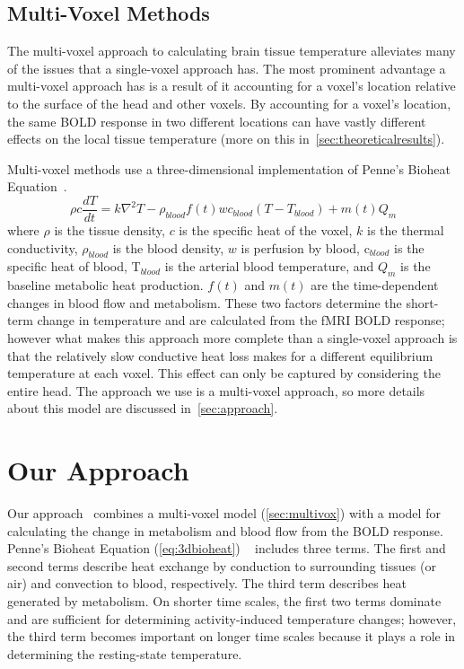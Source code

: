     \subsection{\label{sec:multivox} Multi-Voxel Methods}
    The multi-voxel approach to calculating brain tissue temperature alleviates many of the issues that a single-voxel approach has.  The most prominent advantage a multi-voxel approach has is a result of it accounting for a voxel's location relative to the surface of the head and other voxels.  By accounting for a voxel's location, the same BOLD response in two different locations can have vastly different effects on the local tissue temperature (more on this in~\cref{sec:theoreticalresults}).
    
    Multi-voxel methods use a three-dimensional implementation of Penne's Bioheat Equation~\citep{collins}.
    \begin{equation} \label{eq:3dbioheat} 
    	\rho c \frac{dT}{dt} = k \nabla^{2}T-\rho_{blood}f(t)wc_{blood}(T-T_{blood})+m(t)Q_{m} 
    \end{equation}
  where $\rho$ is the tissue density, $c$ is the specific heat of the voxel, $k$ is the thermal conductivity, $\rho_{blood}$ is the blood density, $w$ is perfusion by blood, c$_{blood}$ is the specific heat of blood, T$_{blood}$ is the arterial blood temperature, and $Q_{m}$ is the baseline metabolic heat production. $f(t)$ and $m(t)$ are the time-dependent changes in blood flow and metabolism. These two factors determine the short-term change in temperature and are calculated from the fMRI BOLD response; however what makes this approach more complete than a single-voxel approach is that the relatively slow conductive heat loss makes for a different equilibrium temperature at each voxel.  This effect can only be captured by considering the entire head.  The approach we use is a multi-voxel approach, so more details about this model are discussed in~\cref{sec:approach}.

\section{\label{sec:approach} Our Approach}
  Our approach~\citep{rothmeier2011,rothmeier2012} combines a multi-voxel model (\cref{sec:multivox}) with a model for calculating the change in metabolism and blood flow from the BOLD response.  Penne's Bioheat Equation (\cref{eq:3dbioheat}) ~\citep{pennes,sotero2011} includes three terms. The first and second terms describe heat exchange by conduction to surrounding tissues (or air) and convection to blood, respectively.  The third term describes heat generated by metabolism. On shorter time scales, the first two terms dominate and are sufficient for determining activity-induced temperature changes; however, the third term becomes important on longer time scales because it plays a role in determining the resting-state temperature.
  
